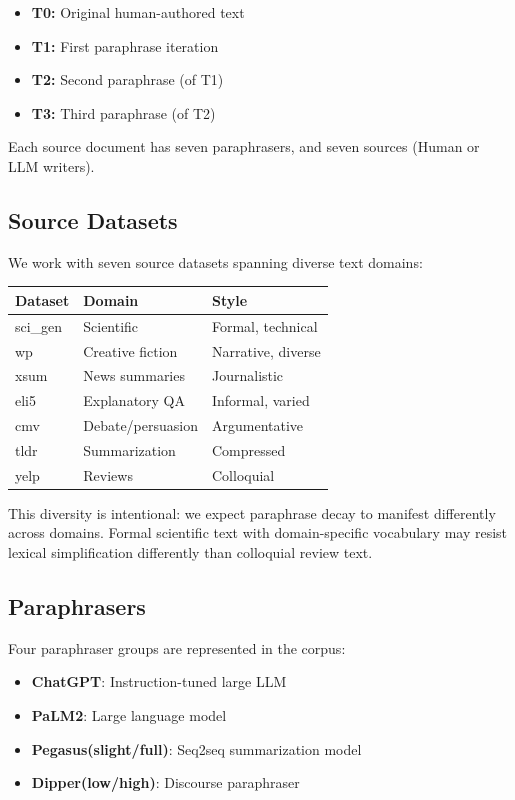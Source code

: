\documentclass[10pt,twocolumn]{article}
\begin{document}
\begin{itemize}[leftmargin=*,topsep=2pt,itemsep=1pt]
  \item \textbf{T0:} Original human-authored text
  \item \textbf{T1:} First paraphrase iteration
  \item \textbf{T2:} Second paraphrase (of T1)
  \item \textbf{T3:} Third paraphrase (of T2)
\end{itemize}

\noindent Each source document has seven paraphrasers, and seven sources (Human or LLM writers).

\subsection{Source Datasets}
We work with seven source datasets spanning diverse text domains:

\begin{center}
\small
\begin{tabular}{lll}
\toprule
\textbf{Dataset} & \textbf{Domain} & \textbf{Style} \\
\midrule
sci\_gen  & Scientific    & Formal, technical \\
wp        & Creative fiction & Narrative, diverse \\
xsum      & News summaries & Journalistic \\
eli5      & Explanatory QA & Informal, varied \\
cmv       & Debate/persuasion & Argumentative \\
tldr      & Summarization & Compressed \\
yelp      & Reviews       & Colloquial \\
\bottomrule
\end{tabular}
\end{center}

\noindent This diversity is intentional: we expect paraphrase decay to manifest
differently across domains. Formal scientific text with domain-specific
vocabulary may resist lexical simplification differently than colloquial
review text.

\subsection{Paraphrasers}
Four paraphraser groups are represented in the corpus:

\begin{itemize}[leftmargin=*,topsep=2pt,itemsep=1pt]
  \item \textbf{ChatGPT}: Instruction-tuned large LLM
  \item \textbf{PaLM2}: Large language model
  \item \textbf{Pegasus(slight/full)}: Seq2seq summarization model
  \item \textbf{Dipper(low/high)}: Discourse paraphraser
\end{itemize}
\end{document}
